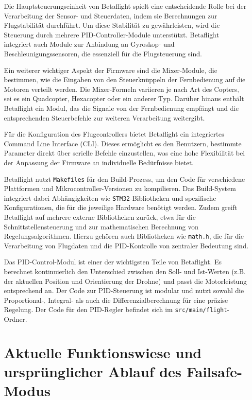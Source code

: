 Die Hauptsteuerungseinheit von Betaflight spielt eine entscheidende Rolle bei der Verarbeitung der Sensor- und Steuerdaten, indem sie Berechnungen zur Flugstabilität durchführt. Um diese Stabilität zu gewährleisten, wird die Steuerung  durch mehrere PID-Controller-Module unterstützt. Betaflight integriert auch Module zur Anbindung an Gyroskop- und Beschleunigungssensoren, die essenziell für die Flugsteuerung sind.

Ein weiterer wichtiger Aspekt der Firmware sind die Mixer-Module, die bestimmen, wie die Eingaben von den Steuerknüppeln der Fernbedienung auf die Motoren verteilt werden. Die Mixer-Formeln variieren je nach Art des Copters, sei es ein Quadcopter, Hexacopter oder ein anderer Typ. Darüber hinaus enthält Betaflight ein Modul, das die Signale von der Fernbedienung empfängt und die entsprechenden Steuerbefehle zur weiteren Verarbeitung weitergibt.


Für die Konfiguration des Flugcontrollers bietet Betaflight ein integriertes Command Line Interface (CLI). Dieses ermöglicht es den Benutzern, bestimmte Parameter direkt über serielle Befehle einzustellen, was eine hohe Flexibilität bei der Anpassung der Firmware an individuelle Bedürfnisse bietet.


Betaflight nutzt \texttt{Makefiles} für den Build-Prozess, um den Code für verschiedene Plattformen und Mikrocontroller-Versionen zu kompilieren. Das Build-System integriert dabei Abhängigkeiten wie \texttt{STM32}-Bibliotheken und spezifische Konfigurationen, die für die jeweilige Hardware benötigt werden. Zudem greift Betaflight auf mehrere externe Bibliotheken zurück, etwa für die Schnittstellensteuerung und zur mathematischen Berechnung von Regelungsalgorithmen. Hierzu gehören auch Bibliotheken wie \texttt{math.h}, die für die Verarbeitung von Flugdaten und die PID-Kontrolle von zentraler Bedeutung sind.

Das PID-Control-Modul ist einer der wichtigsten Teile von Betaflight. Es berechnet kontinuierlich den Unterschied zwischen den Soll- und Ist-Werten (z.B. der aktuellen Position und Orientierung der Drohne) und passt die Motorleistung entsprechend an. Der Code zur PID-Steuerung ist modular und nutzt sowohl die Proportional-, Integral- als auch die Differenzialberechnung für eine präzise Regelung. Der Code für den PID-Regler befindet sich im \texttt{src/main/flight}-Ordner.

\section{Aktuelle Funktionswiese und ursprünglicher Ablauf des Failsafe-Modus}\label{sec:Failsafeablaufalt}

